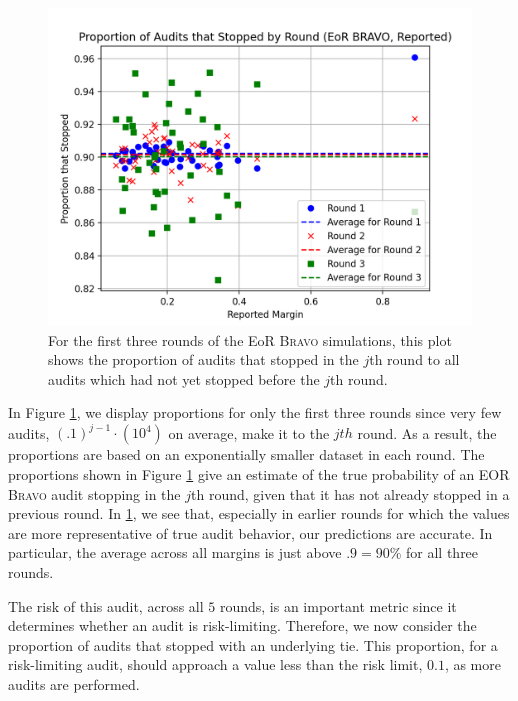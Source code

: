 \documentclass[runningheads]{llncs}
\newcommand{\BRAVO}{\textsc{Bravo}\xspace}
\begin{document}
\begin{figure}[H]
\includegraphics[width=\textwidth]{eor_bravo_90perc_10^4_corrected/sprob_first_three.png}\caption{
For the first three rounds of the EoR \BRAVO simulations, this plot shows the proportion of audits that stopped in the $j$th round
to all audits which had not yet stopped before the $j$th round.}
\label{fig:eor_bravo_sprob}
\end{figure}

In Figure \ref{fig:eor_bravo_sprob}, we display proportions for only the first three rounds
since very few audits, $(.1)^{j-1}\cdot(10^4)$ on average, 
make it to the $jth$ round.
As  a result, the proportions are based on an exponentially smaller dataset in each round.
The proportions shown in Figure \ref{fig:eor_bravo_sprob} give an estimate
of the true probability of an EOR \BRAVO audit stopping in the $j$th round,
given that it has not already stopped in a previous round. 
In \ref{fig:eor_bravo_sprob}, we see that, especially in earlier rounds for which 
the values are more representative of true audit behavior, 
our predictions are accurate.
In particular, the average across all margins is just above $.9=90\%$ for
all three rounds.

The risk of this audit, across all $5$ rounds, is an important metric since it determines whether an audit is risk-limiting.
Therefore, we now consider the proportion of audits that stopped with an underlying tie.
This proportion, for a risk-limiting audit, should approach a value less than the risk limit, $0.1$, as more audits are performed.
\end{document}
